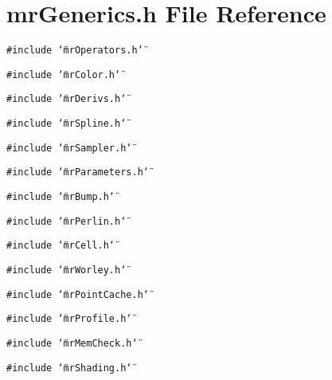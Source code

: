 \section{mr\-Generics.h File Reference}
\label{mrGenerics_8h}
{\tt \#include \char`\"{}mr\-Operators.h\char`\"{}}\par
{\tt \#include \char`\"{}mr\-Color.h\char`\"{}}\par
{\tt \#include \char`\"{}mr\-Derivs.h\char`\"{}}\par
{\tt \#include \char`\"{}mr\-Spline.h\char`\"{}}\par
{\tt \#include \char`\"{}mr\-Sampler.h\char`\"{}}\par
{\tt \#include \char`\"{}mr\-Parameters.h\char`\"{}}\par
{\tt \#include \char`\"{}mr\-Bump.h\char`\"{}}\par
{\tt \#include \char`\"{}mr\-Perlin.h\char`\"{}}\par
{\tt \#include \char`\"{}mr\-Cell.h\char`\"{}}\par
{\tt \#include \char`\"{}mr\-Worley.h\char`\"{}}\par
{\tt \#include \char`\"{}mr\-Point\-Cache.h\char`\"{}}\par
{\tt \#include \char`\"{}mr\-Profile.h\char`\"{}}\par
{\tt \#include \char`\"{}mr\-Mem\-Check.h\char`\"{}}\par
{\tt \#include \char`\"{}mr\-Shading.h\char`\"{}}\par
